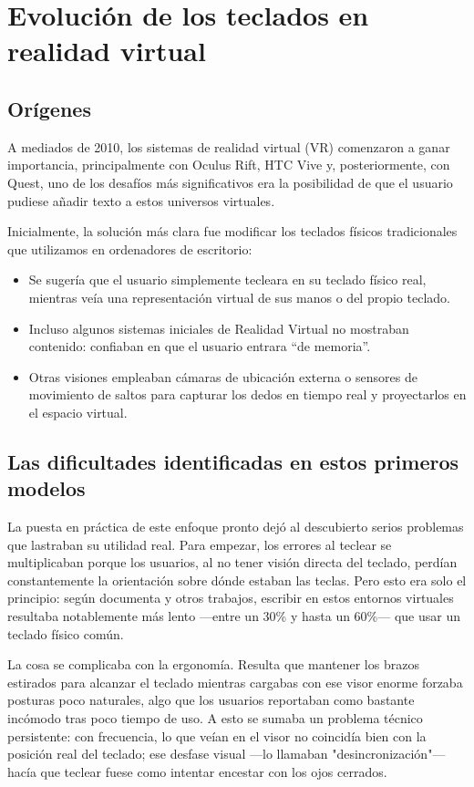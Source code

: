 \section{Evolución de los teclados en realidad virtual}
\subsection{Orígenes}
A mediados de 2010, los sistemas de realidad virtual (VR) comenzaron a ganar importancia, principalmente con Oculus Rift, HTC Vive y, posteriormente, con Quest, uno de los desafíos más significativos era la posibilidad de que el usuario pudiese añadir texto a estos universos virtuales. 

Inicialmente, la solución más clara fue modificar los teclados físicos tradicionales que utilizamos en ordenadores de escritorio:

\begin{itemize}
	\item Se sugería que el usuario simplemente tecleara en su teclado físico real, mientras veía una representación virtual de sus manos o del propio teclado.
	\item Incluso algunos sistemas iniciales de Realidad Virtual no mostraban contenido: confiaban en que el usuario entrara ``de memoria''.
	\item Otras visiones empleaban cámaras de ubicación externa o sensores de movimiento de saltos para capturar los dedos en tiempo real y proyectarlos en el espacio virtual.
\end{itemize}

\subsection{Las dificultades identificadas en estos primeros modelos}

La puesta en práctica de este enfoque pronto dejó al descubierto serios problemas que lastraban su utilidad real. Para empezar, los errores al teclear se multiplicaban porque los usuarios, al no tener visión directa del teclado, perdían constantemente la orientación sobre dónde estaban las teclas. Pero esto era solo el principio: según documenta \cite{peng2024exploring} y otros trabajos, escribir en estos entornos virtuales resultaba notablemente más lento —entre un 30\% y hasta un 60\%— que usar un teclado físico común.

La cosa se complicaba con la ergonomía. Resulta que mantener los brazos estirados para alcanzar el teclado mientras cargabas con ese visor enorme forzaba posturas poco naturales, algo que los usuarios reportaban como bastante incómodo tras poco tiempo de uso. A esto se sumaba un problema técnico persistente: con frecuencia, lo que veían en el visor no coincidía bien con la posición real del teclado; ese desfase visual —lo llamaban "desincronización"— hacía que teclear fuese como intentar encestar con los ojos cerrados.

